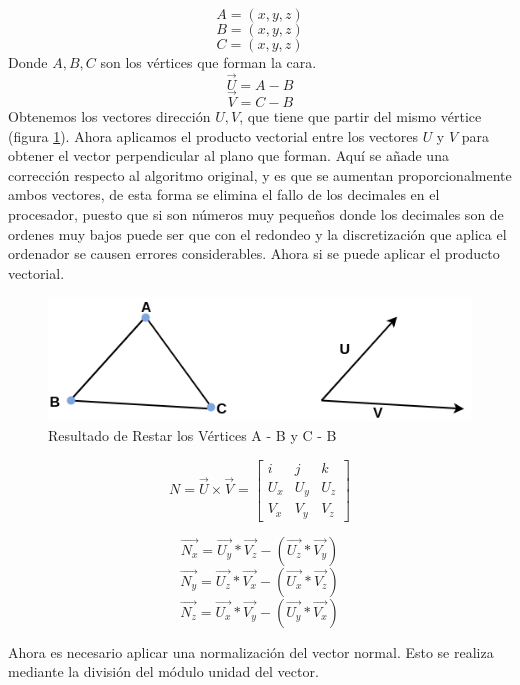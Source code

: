 $$A = (x,y,z)$$ 
$$B = (x,y,z)$$ 
$$C = (x,y,z)$$
Donde $A,B,C$ son los vértices que forman la cara.
\vspace{0.3cm}
$$\overrightarrow{U} = A - B$$
$$\overrightarrow{V} = C - B$$
Obtenemos los vectores dirección $U,V$, que tiene que partir del mismo vértice (figura \ref{fig:productovectorial.png}). Ahora aplicamos el producto vectorial entre los vectores $U$ y $V$ para obtener el vector perpendicular al plano que forman. Aquí se añade una corrección respecto al algoritmo original, y es que se aumentan proporcionalmente ambos vectores, de esta forma se elimina el fallo de los decimales en el procesador, puesto que si son números muy pequeños donde los decimales son de ordenes muy bajos puede ser que con el redondeo y la discretización que aplica el ordenador se causen errores considerables.
Ahora si se puede aplicar el producto vectorial.
\begin{figure} %
	\centering
	\includegraphics[scale=0.4]{imagenes/productovectorial.png} 
	\caption{Resultado de Restar los Vértices A - B y C - B} \label{fig:productovectorial.png}
\end{figure}

\[ 
N = \overrightarrow{U} \times \overrightarrow{V} = \begin{bmatrix}
i & j & k \\
U_x & U_y & U_z \\
V_x & V_y & V_z 
\end{bmatrix}  
\]

\vspace{0.3cm}

$$\overrightarrow{N_x} = \overrightarrow{U_y}*\overrightarrow{V_z} - (\overrightarrow{U_z}*\overrightarrow{V_y})$$
$$\overrightarrow{N_y} = \overrightarrow{U_z}*\overrightarrow{V_x} - (\overrightarrow{U_x}*\overrightarrow{V_z})$$
$$\overrightarrow{N_z} = \overrightarrow{U_x}*\overrightarrow{V_y} - (\overrightarrow{U_y}*\overrightarrow{V_x})$$

Ahora es necesario aplicar una normalización del vector normal. Esto se realiza mediante la división del módulo unidad del vector.

